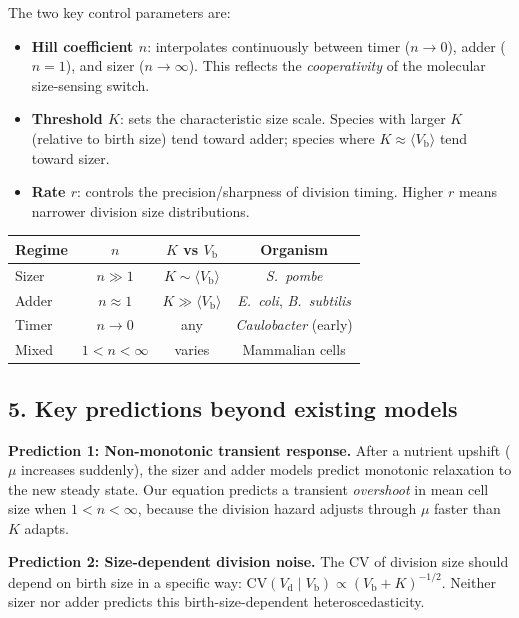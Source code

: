 \documentclass[11pt]{article}
\newcommand{\Vb}{V_{\mathrm{b}}}
\newcommand{\Vd}{V_{\mathrm{d}}}
\begin{document}
The two key control parameters are:
\begin{itemize}
  \item \textbf{Hill coefficient $n$}: interpolates continuously between timer ($n \to 0$),
        adder ($n = 1$), and sizer ($n \to \infty$). This reflects the
        \emph{cooperativity} of the molecular size-sensing switch.
  \item \textbf{Threshold $K$}: sets the characteristic size scale. Species with
        larger $K$ (relative to birth size) tend toward adder; species where
        $K \approx \langle \Vb \rangle$ tend toward sizer.
  \item \textbf{Rate $r$}: controls the precision/sharpness of division timing.
        Higher $r$ means narrower division size distributions.
\end{itemize}

\begin{center}
\begin{tabular}{lccc}
\hline
\textbf{Regime} & \textbf{$n$} & \textbf{$K$ vs $\Vb$} & \textbf{Organism} \\
\hline
Sizer & $n \gg 1$ & $K \sim \langle \Vb \rangle$ & \textit{S.~pombe} \\
Adder & $n \approx 1$ & $K \gg \langle \Vb \rangle$ & \textit{E.~coli}, \textit{B.~subtilis} \\
Timer & $n \to 0$ & any & \textit{Caulobacter} (early) \\
Mixed & $1 < n < \infty$ & varies & Mammalian cells \\
\hline
\end{tabular}
\end{center}

\subsection*{5. Key predictions beyond existing models}

\textbf{Prediction 1: Non-monotonic transient response.}
After a nutrient upshift ($\mu$ increases suddenly), the sizer and adder models
predict monotonic relaxation to the new steady state. Our equation predicts a
transient \emph{overshoot} in mean cell size when $1 < n < \infty$, because the
division hazard adjusts through $\mu$ faster than $K$ adapts.

\textbf{Prediction 2: Size-dependent division noise.}
The CV of division size should depend on birth size in a specific way:
$\mathrm{CV}(\Vd \mid \Vb) \propto (\Vb + K)^{-1/2}$. Neither sizer nor adder
predicts this birth-size-dependent heteroscedasticity.
\end{document}
